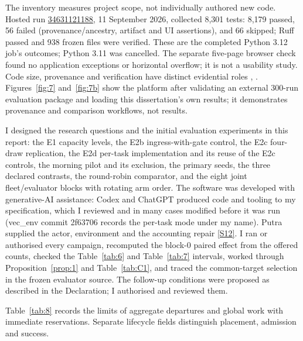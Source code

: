 \documentclass[12pt,a4paper]{article}
\begin{document}
The inventory measures project scope, not individually authored new code. Hosted run \href{\detokenize{https://github.com/Abdulla4akash/traffictwin/actions/runs/34631121188}}{34631121188}, 11 September 2026, collected 8,301 tests: 8,179 passed, 56 failed (provenance/ancestry, artifact and UI assertions), and 66 skipped; Ruff passed and 938 frozen files were verified. These are the completed Python 3.12 job's outcomes; Python 3.11 was cancelled. The separate five-page browser check found no application exceptions or horizontal overflow; it is not a usability study. Code size, provenance and verification have distinct evidential roles \cite{ref37}, \cite{ref38}. Figures~\ref{fig:7} and~\ref{fig:7b} show the platform after validating an external 300-run evaluation package and loading this dissertation's own results; it demonstrates provenance and comparison workflows, not results.


I designed the research questions and the initial evaluation experiments in this report: the E1 capacity levels, the E2b ingress-with-gate control, the E2c four-draw replication, the E2d per-task implementation and its reuse of the E2c controls, the morning pilot and its exclusion, the primary seeds, the three declared contrasts, the round-robin comparator, and the eight joint fleet/evaluator blocks with rotating arm order. The software was developed with generative-AI assistance: Codex and ChatGPT produced code and tooling to my specification, which I reviewed and in many cases modified before it was run (vec\_env commit 2f63706 records the per-task mode under my name). Putra supplied the actor, environment and the accounting repair \hyperref[source-s12]{[S12]}. I ran or authorised every campaign, recomputed the block-0 paired effect from the offered counts, checked the Table~\ref{tab:6} and Table~\ref{tab:7} intervals, worked through Proposition~\ref{prop:1} and Table~\ref{tab:C1}, and traced the common-target selection in the frozen evaluator source. The follow-up conditions were proposed as described in the Declaration; I authorised and reviewed them.

Table~\ref{tab:8} records the limits of aggregate departures and global work with immediate reservations. Separate lifecycle fields distinguish placement, admission and success.
\end{document}
